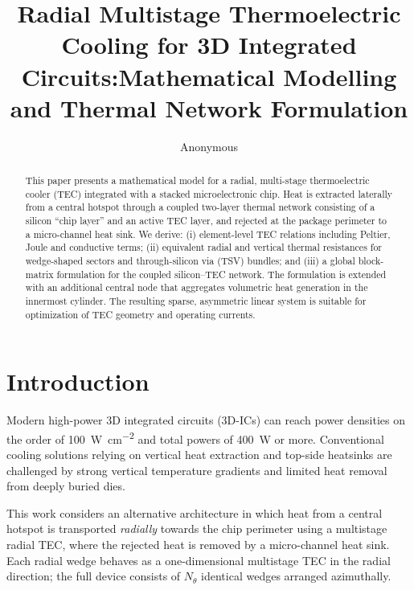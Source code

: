 \documentclass[conference]{IEEEtran}
\begin{document}
	\title{Radial Multistage Thermoelectric Cooling for 3D Integrated Circuits:\newline Mathematical Modelling and Thermal Network Formulation}

\author{Anonymous}

\maketitle

\begin{abstract}
This paper presents a mathematical model for a radial, multi-stage thermoelectric cooler (TEC) integrated with a stacked microelectronic chip. Heat is extracted laterally from a central hotspot through a coupled two-layer thermal network consisting of a silicon ``chip layer'' and an active TEC layer, and rejected at the package perimeter to a micro-channel heat sink. We derive: (i) element-level TEC relations including Peltier, Joule and conductive terms; (ii) equivalent radial and vertical thermal resistances for wedge-shaped sectors and through-silicon via (TSV) bundles; and (iii) a global block-matrix formulation for the coupled silicon--TEC network. The formulation is extended with an additional central node that aggregates volumetric heat generation in the innermost cylinder. The resulting sparse, asymmetric linear system is suitable for optimization of TEC geometry and operating currents.
\end{abstract}


\section{Introduction}

Modern high-power 3D integrated circuits (3D-ICs) can reach power densities on the order of \SI{100}{\watt\per\centi\meter\squared} and total powers of \SI{400}{W} or more. Conventional cooling solutions relying on vertical heat extraction and top-side heatsinks are challenged by strong vertical temperature gradients and limited heat removal from deeply buried dies.

This work considers an alternative architecture in which heat from a central hotspot is transported \emph{radially} towards the chip perimeter using a multistage radial TEC, where the rejected heat is removed by a micro-channel heat sink. Each radial wedge behaves as a one-dimensional multistage TEC in the radial direction; the full device consists of $N_\theta$ identical wedges arranged azimuthally.
\end{document}
